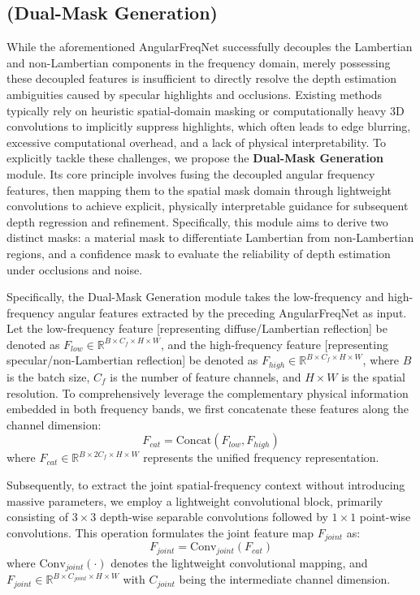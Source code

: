 \documentclass[lettersize,journal]{IEEEtran}
\begin{document}
\subsection{(Dual-Mask Generation)}

While the aforementioned AngularFreqNet successfully decouples the Lambertian and non-Lambertian components in the frequency domain, merely possessing these decoupled features is insufficient to directly resolve the depth estimation ambiguities caused by specular highlights and occlusions. Existing methods typically rely on heuristic spatial-domain masking or computationally heavy 3D convolutions to implicitly suppress highlights, which often leads to edge blurring, excessive computational overhead, and a lack of physical interpretability. To explicitly tackle these challenges, we propose the \textbf{Dual-Mask Generation} module. Its core principle involves fusing the decoupled angular frequency features, then mapping them to the spatial mask domain through lightweight convolutions to achieve explicit, physically interpretable guidance for subsequent depth regression and refinement. Specifically, this module aims to derive two distinct masks: a material mask to differentiate Lambertian from non-Lambertian regions, and a confidence mask to evaluate the reliability of depth estimation under occlusions and noise.

Specifically, the Dual-Mask Generation module takes the low-frequency and high-frequency angular features extracted by the preceding AngularFreqNet as input. Let the low-frequency feature  [representing diffuse/Lambertian reflection] be denoted as $F_{low} \in \mathbb{R}^{B \times C_f \times H \times W}$, and the high-frequency feature  [representing specular/non-Lambertian reflection] be denoted as $F_{high} \in \mathbb{R}^{B \times C_f \times H \times W}$, where $B$ is the batch size, $C_f$ is the number of feature channels, and $H \times W$ is the spatial resolution. To comprehensively leverage the complementary physical information embedded in both frequency bands, we first concatenate these features along the channel dimension:
\begin{equation}
\label{eq:eq10}
F_{cat} = \text{Concat}(F_{low}, F_{high})
\end{equation}
where $F_{cat} \in \mathbb{R}^{B \times 2C_f \times H \times W}$ represents the unified frequency representation. 

Subsequently, to extract the joint spatial-frequency context without introducing massive parameters, we employ a lightweight convolutional block, primarily consisting of $3 \times 3$ depth-wise separable convolutions followed by $1 \times 1$ point-wise convolutions. This operation formulates the joint feature map $F_{joint}$ as:
\begin{equation}
\label{eq:eq11}
F_{joint} = \text{Conv}_{joint}(F_{cat})
\end{equation}
where $\text{Conv}_{joint}(\cdot)$ denotes the lightweight convolutional mapping, and $F_{joint} \in \mathbb{R}^{B \times C_{joint} \times H \times W}$ with $C_{joint}$ being the intermediate channel dimension. 
\end{document}
